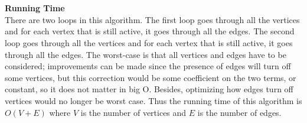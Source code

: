 \\ \\ \textbf{Running Time}\\
There are two loops in this algorithm. The first loop goes through all the vertices and for each vertex that is still active, it goes through all the edges. The second loop goes through all the vertices and for each vertex that is still active, it goes through all the edges. The worst-case is that all vertices and edges have to be considered; improvements can be made since the presence of edges will turn off some vertices, but this correction would be some coefficient on the two terms, or constant, so it does not matter in big O. Besides, optimizing how edges turn off vertices would no longer be worst case. Thus the running time of this algorithm is $O(V+E)$ where $V$ is the number of vertices and $E$ is the number of edges.\\
